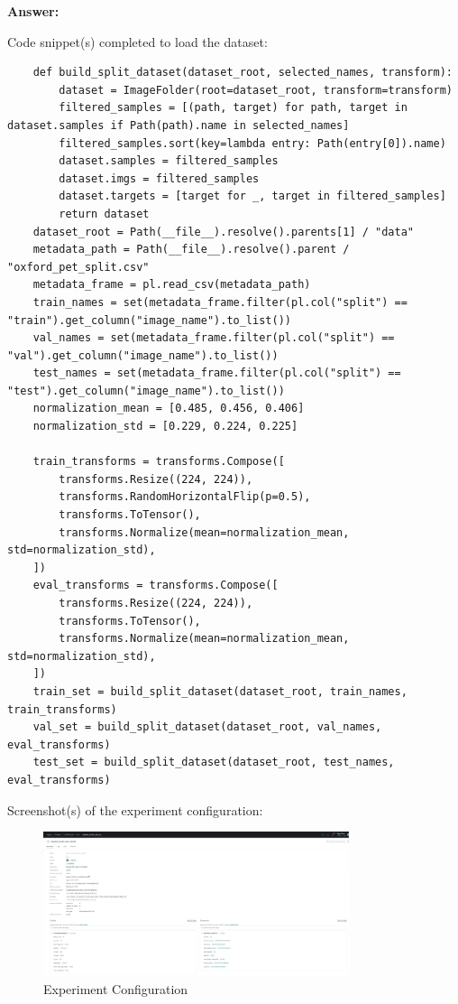 \documentclass[11pt, oneside]{article}   	%
\begin{document}
\begin{answerbox} \textbf{Answer:} \vspace*{1cm}

    Code snippet(s) completed to load the dataset:
\begin{verbatim}
    def build_split_dataset(dataset_root, selected_names, transform):
        dataset = ImageFolder(root=dataset_root, transform=transform)
        filtered_samples = [(path, target) for path, target in dataset.samples if Path(path).name in selected_names]
        filtered_samples.sort(key=lambda entry: Path(entry[0]).name)
        dataset.samples = filtered_samples
        dataset.imgs = filtered_samples
        dataset.targets = [target for _, target in filtered_samples]
        return dataset
    dataset_root = Path(__file__).resolve().parents[1] / "data"
    metadata_path = Path(__file__).resolve().parent / "oxford_pet_split.csv"
    metadata_frame = pl.read_csv(metadata_path)
    train_names = set(metadata_frame.filter(pl.col("split") == "train").get_column("image_name").to_list())
    val_names = set(metadata_frame.filter(pl.col("split") == "val").get_column("image_name").to_list())
    test_names = set(metadata_frame.filter(pl.col("split") == "test").get_column("image_name").to_list())
    normalization_mean = [0.485, 0.456, 0.406]
    normalization_std = [0.229, 0.224, 0.225]

    train_transforms = transforms.Compose([
        transforms.Resize((224, 224)),
        transforms.RandomHorizontalFlip(p=0.5),
        transforms.ToTensor(),
        transforms.Normalize(mean=normalization_mean, std=normalization_std),
    ])
    eval_transforms = transforms.Compose([
        transforms.Resize((224, 224)),
        transforms.ToTensor(),
        transforms.Normalize(mean=normalization_mean, std=normalization_std),
    ])
    train_set = build_split_dataset(dataset_root, train_names, train_transforms)
    val_set = build_split_dataset(dataset_root, val_names, eval_transforms)
    test_set = build_split_dataset(dataset_root, test_names, eval_transforms)
\end{verbatim}

Screenshot(s) of the experiment configuration:

\begin{figure}[h]
    \centering
    \includegraphics[width=0.8\textwidth]{images/experiment_configuration.png}
    \caption{Experiment Configuration}
\end{figure}


\end{answerbox}
\end{document}
